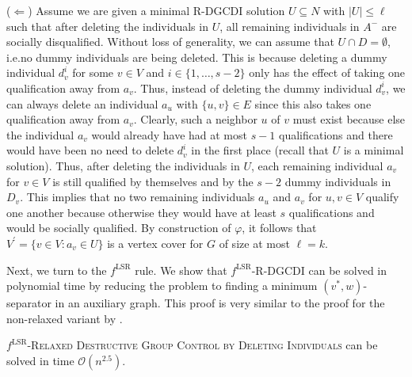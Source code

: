\documentclass[
    12pt,               %
    a4paper,            %
    bibtotoc,           %
    pointlessnumbers,   %
    ngerman,            %
    titlepage,          %
    leqno,              %
    ]{scrarticle}       %
\begin{document}
\begin{Proof}
($\Leftarrow$) Assume we are given a minimal R-DGCDI solution $U \subseteq N$ with $|U| \leq \ell$ such that after deleting the individuals in $U$, all remaining individuals in $A^-$ are socially disqualified. Without loss of generality, we can assume that $U \cap D = \emptyset$, i.e.\@ no dummy individuals are being deleted. This is because deleting a dummy individual $d_v^i$ for some $v \in V$ and $i \in \{ 1, \ldots, s-2 \}$ only has the effect of taking one qualification away from $a_v$. Thus, instead of deleting the dummy individual $d_v^i$, we can always delete an individual $a_u$ with $\{u, v\} \in E$ since this also takes one qualification away from $a_v$. Clearly, such a neighbor $u$ of $v$ must exist because else the individual $a_v$ would already have had at most $s-1$ qualifications and there would have been no need to delete $d_v^i$ in the first place (recall that $U$ is a minimal solution). Thus, after deleting the individuals in $U$, each remaining individual $a_v$ for $v \in V$ is still qualified by themselves and by the $s-2$ dummy individuals in $D_v$. This implies that no two remaining individuals $a_u$ and $a_v$ for $u, v \in V$ qualify one another because otherwise they would have at least $s$ qualifications and would be socially qualified. By construction of $\varphi$, it follows that $V^\prime = \{ v \in V : a_v \in U \}$ is a vertex cover for $G$ of size at most $\ell = k$.
\end{Proof}



Next, we turn to the $f^{\text{LSR}}$ rule. We show that $f^{\text{LSR}}$-R-DGCDI can be solved in polynomial time by reducing the problem to finding a minimum $(v^\ast, w)$-separator in an auxiliary graph. This proof is very similar to the proof for the non-relaxed variant by \textcite[Theorem 7]{ERY20}.



\begin{Theorem} \label{thm:lsr_rdgcdi_p}
$f^{\text{LSR}}$-\textsc{Relaxed Destructive Group Control by Deleting Individuals} can be solved in time $\mathcal{O}(n^{2.5})$.
\end{Theorem}
\end{document}
